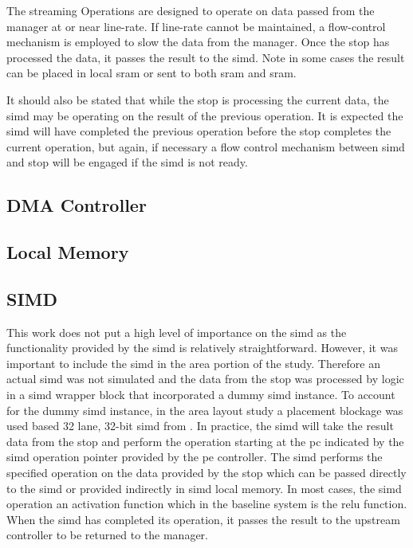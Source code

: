 The streaming Operations are designed to operate on data passed from the manager at or near line-rate. 
If line-rate cannot be maintained, a flow-control mechanism is employed to slow the data from the manager.
Once the \ac{stop} has processed the data, it passes the result to the \ac{simd}. Note in some cases the result can be placed in local \ac{sram} or sent to both \ac{sram} and \ac{sram}.

It should also be stated that while the \ac{stop} is processing the current data, the \ac{simd} may be operating on the result of the previous operation. 
It is expected the \ac{simd} will have completed the previous operation before the \ac{stop} completes the current operation, but again, if necessary a flow control mechanism between \ac{simd} and \ac{stop} will be engaged if the \ac{simd} is not ready.

\subsection{DMA Controller}
\label{sec:Dma Cntl}

\subsection{Local Memory}
\label{sec:Local Memory}

\subsection{SIMD}
\label{sec:simd}

This work does not put a high level of importance on the \ac{simd} as the functionality provided by the \ac{simd} is relatively straightforward.
However, it was important to include the \ac{simd} in the area portion of the study.
Therefore an actual \ac{simd} was not simulated and the data from the \ac{stop} was processed by logic in a \ac{simd} wrapper block that incorporated a dummy \ac{simd} instance.
To account for the dummy \ac{simd} instance, in the area layout study a placement blockage was used based 32 lane, 32-bit \ac{simd} from \cite{schabel2014diss}.
In practice, the \ac{simd} will take the result data from the \ac{stop} and perform the operation starting at the \ac{pc} indicated by the \ac{simd} operation pointer provided by the \ac{pe} controller.
The \ac{simd} performs the specified operation on the data provided by the \ac{stop} which can be passed directly to the \ac{simd} or provided indirectly in \ac{simd} local memory.
In most cases, the \ac{simd} operation \ac{an} activation function which in the baseline system is the \ac{relu} function.
When the \ac{simd} has completed its operation, it passes the result to the upstream controller to be returned to the manager.

